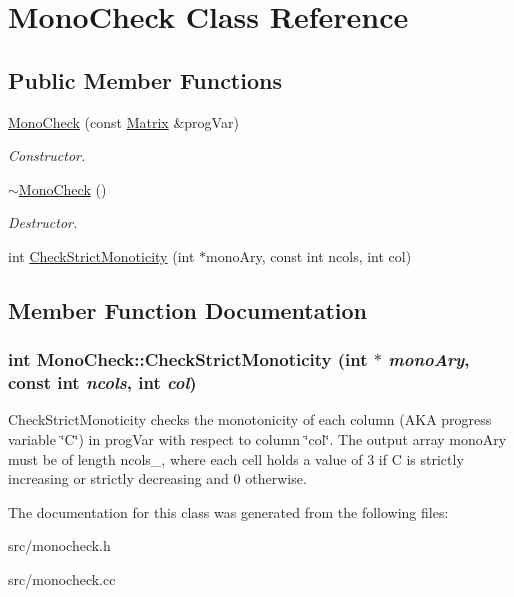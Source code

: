 \hypertarget{classMonoCheck}{
\section{MonoCheck Class Reference}
\label{d8/ddf/classMonoCheck}
}
\subsection*{Public Member Functions}
\begin{DoxyCompactItemize}
\item 
\hypertarget{classMonoCheck_a4cee9c89dd8a6c19cd01d597343c4d99}{
\hyperlink{classMonoCheck_a4cee9c89dd8a6c19cd01d597343c4d99}{MonoCheck} (const \hyperlink{classMatrix}{Matrix} \&progVar)}
\label{d8/ddf/classMonoCheck_a4cee9c89dd8a6c19cd01d597343c4d99}

\begin{DoxyCompactList}\small\item\em Constructor. \item\end{DoxyCompactList}\item 
\hypertarget{classMonoCheck_a97dc563e5cad68eafabd498d66e86590}{
\hyperlink{classMonoCheck_a97dc563e5cad68eafabd498d66e86590}{$\sim$MonoCheck} ()}
\label{d8/ddf/classMonoCheck_a97dc563e5cad68eafabd498d66e86590}

\begin{DoxyCompactList}\small\item\em Destructor. \item\end{DoxyCompactList}\item 
int \hyperlink{classMonoCheck_af34f3d72ec2d1575526d42bfe4cdfe7a}{CheckStrictMonoticity} (int $\ast$monoAry, const int ncols, int col)
\end{DoxyCompactItemize}


\subsection{Member Function Documentation}
\hypertarget{classMonoCheck_af34f3d72ec2d1575526d42bfe4cdfe7a}{
\subsubsection[{CheckStrictMonoticity}]{\setlength{\rightskip}{0pt plus 5cm}int MonoCheck::CheckStrictMonoticity (int $\ast$ {\em monoAry}, \/  const int {\em ncols}, \/  int {\em col})}}
\label{d8/ddf/classMonoCheck_af34f3d72ec2d1575526d42bfe4cdfe7a}
CheckStrictMonoticity checks the monotonicity of each column (AKA progress variable \char`\"{}C\char`\"{}) in progVar with respect to column \char`\"{}col\char`\"{}. The output array monoAry must be of length ncols\_\-, where each cell holds a value of 3 if C is strictly increasing or strictly decreasing and 0 otherwise. 

The documentation for this class was generated from the following files:\begin{DoxyCompactItemize}
\item 
src/monocheck.h\item 
src/monocheck.cc\end{DoxyCompactItemize}
